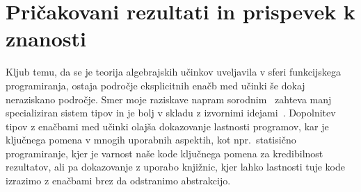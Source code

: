 \documentclass{article}
\begin{document}
\section*{Pričakovani rezultati in prispevek k znanosti}

Kljub temu, da se je teorija algebrajskih učinkov uveljavila v sferi funkcijskega programiranja, ostaja področje eksplicitnih enačb med učinki še dokaj neraziskano področje. Smer moje raziskave napram sorodnim~\cite{DBLP:journals/pacmpl/Ahman18} zahteva manj specializiran sistem tipov in je bolj v skladu z izvornimi idejami~\cite{DBLP:conf/esop/PlotkinP09}. Dopolnitev tipov z enačbami med učinki olajša dokazovanje lastnosti programov, kar je ključnega pomena v mnogih uporabnih aspektih, kot npr.\ statisično programiranje, kjer je varnost naše kode ključnega pomena za kredibilnost rezultatov, ali pa dokazovanje z uporabo knjižnic, kjer lahko lastnosti tuje kode izrazimo z enačbami brez da odstranimo abstrakcijo.

\renewcommand\refname{Literatura}


\end{document}
